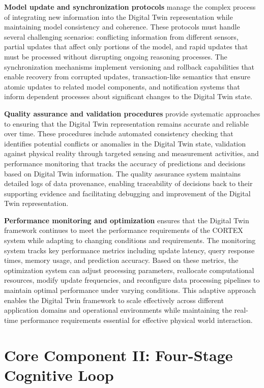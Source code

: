 \textbf{Model update and synchronization protocols} manage the complex process of integrating new information into the Digital Twin representation while maintaining model consistency and coherence. These protocols must handle several challenging scenarios: conflicting information from different sensors, partial updates that affect only portions of the model, and rapid updates that must be processed without disrupting ongoing reasoning processes. The synchronization mechanisms implement versioning and rollback capabilities that enable recovery from corrupted updates, transaction-like semantics that ensure atomic updates to related model components, and notification systems that inform dependent processes about significant changes to the Digital Twin state.

\textbf{Quality assurance and validation procedures} provide systematic approaches to ensuring that the Digital Twin representation remains accurate and reliable over time. These procedures include automated consistency checking that identifies potential conflicts or anomalies in the Digital Twin state, validation against physical reality through targeted sensing and measurement activities, and performance monitoring that tracks the accuracy of predictions and decisions based on Digital Twin information. The quality assurance system maintains detailed logs of data provenance, enabling traceability of decisions back to their supporting evidence and facilitating debugging and improvement of the Digital Twin representation.

\textbf{Performance monitoring and optimization} ensures that the Digital Twin framework continues to meet the performance requirements of the CORTEX system while adapting to changing conditions and requirements. The monitoring system tracks key performance metrics including update latency, query response times, memory usage, and prediction accuracy. Based on these metrics, the optimization system can adjust processing parameters, reallocate computational resources, modify update frequencies, and reconfigure data processing pipelines to maintain optimal performance under varying conditions. This adaptive approach enables the Digital Twin framework to scale effectively across different application domains and operational environments while maintaining the real-time performance requirements essential for effective physical world interaction.

\section{Core Component II: Four-Stage Cognitive Loop}

